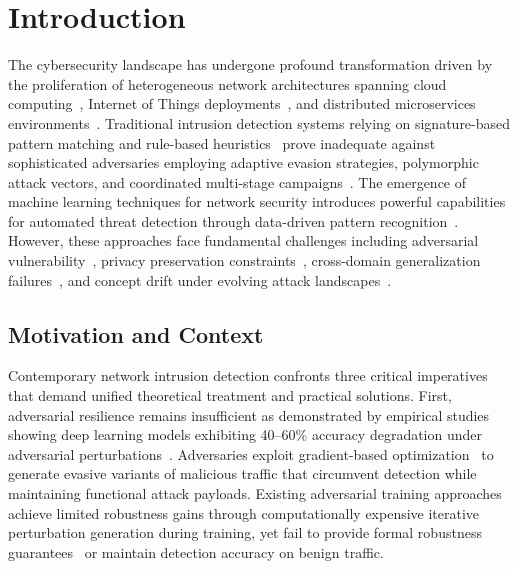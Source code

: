 \chapter*{Introduction}

The cybersecurity landscape has undergone profound transformation driven by the proliferation of heterogeneous network architectures spanning cloud computing~\cite{sun2021hybrid}, Internet of Things deployments~\cite{zeadally2020design}, and distributed microservices environments~\cite{hong2022multi}. Traditional intrusion detection systems relying on signature-based pattern matching and rule-based heuristics~\cite{scarfone2007guide} prove inadequate against sophisticated adversaries employing adaptive evasion strategies, polymorphic attack vectors, and coordinated multi-stage campaigns~\cite{verizon2024dbir}. The emergence of machine learning techniques for network security introduces powerful capabilities for automated threat detection through data-driven pattern recognition~\cite{buczak2016survey}. However, these approaches face fundamental challenges including adversarial vulnerability~\cite{corona2019adversarial}, privacy preservation constraints~\cite{truex2019demystifying}, cross-domain generalization failures~\cite{zhao2019learning}, and concept drift under evolving attack landscapes~\cite{gama2014survey}.

\section*{Motivation and Context}

Contemporary network intrusion detection confronts three critical imperatives that demand unified theoretical treatment and practical solutions. First, adversarial resilience remains insufficient as demonstrated by empirical studies showing deep learning models exhibiting 40--60\% accuracy degradation under adversarial perturbations~\cite{corona2019adversarial,biggio2013evasion}. Adversaries exploit gradient-based optimization~\cite{carlini2017towards} to generate evasive variants of malicious traffic that circumvent detection while maintaining functional attack payloads. Existing adversarial training approaches~\cite{madry2018towards} achieve limited robustness gains through computationally expensive iterative perturbation generation during training, yet fail to provide formal robustness guarantees~\cite{cohen2019certified} or maintain detection accuracy on benign traffic.

